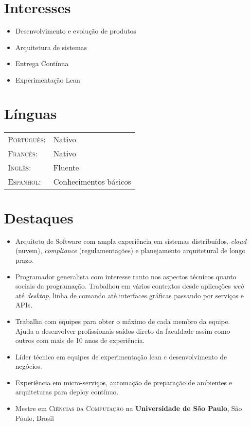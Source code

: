 \documentclass[letter,10pt]{article}
\begin{document}
\begin{multicols}{2}
\section{Interesses}
\begin{itemize}
\item Desenvolvimento e evolução de produtos
\item Arquitetura de sistemas
\item Entrega Contínua
\item Experimentação Lean
\end{itemize}

\section{Línguas}
\begin{tabular}{p{2.5cm}l}
 \textsc{Português:}&Nativo\\
 \textsc{Francês:}&Nativo\\
 \textsc{Inglês:}&Fluente\\
 \textsc{Espanhol:}&Conhecimentos básicos\\
\end{tabular}
\end{multicols}


\section{Destaques}

\begin{itemize}
\item Arquiteto de Software com ampla experiência em sistemas distribuídos, \emph{cloud} (nuvem), \emph{compliance} (regulamentações) e planejamento arquitetural de longo prazo.
\item Programador generalista com interesse tanto nos aspectos
  técnicos quanto sociais da programação. Trabalhou em vários contextos desde aplicações \textit{web} até \textit{desktop}, linha de comando até interfaces
  gráficas passando por serviços e APIs.
\item Trabalha com equipes para obter o máximo de cada membro da equipe. Ajuda a desenvolver profissionais saídos direto da faculdade assim como outros com mais de 10 anos de experiência.
\item Líder técnico em equipes de experimentação lean e desenvolvimento de negócios.
\item Experiência em micro-serviços, automação de preparação de ambientes e arquiteturas para deploy contínuo.
\item Mestre em \textsc{Ciências da Computação} na \textbf{Universidade de São Paulo}, São Paulo, Brasil
\end{itemize}
\end{document}
